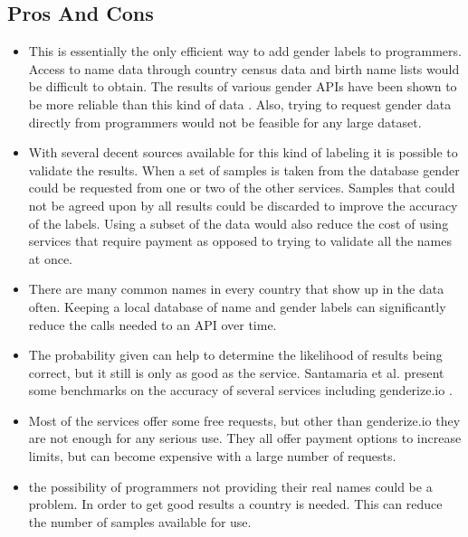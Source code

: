 \documentclass[12pt]{article}
\begin{document}
\subsection{Pros And Cons}
\begin{itemize}
    \item \begin{sloppypar} This is essentially the only efficient way to add gender labels to programmers. Access to name data through country census data and birth name lists would be difficult to obtain. The results of various gender APIs have been shown to be more reliable than this kind of data \cite{Santamaria2018}. Also, trying to request gender data directly from programmers would not be feasible for any large dataset.\end{sloppypar}
    
    \item With several decent sources available for this kind of labeling it is possible to validate the results. When a set of samples is taken from the database gender could be requested from one or two of the other services. Samples that could not be agreed upon by all results could be discarded to improve the accuracy of the labels. Using a subset of the data would also reduce the cost of using services that require payment as opposed to trying to validate all the names at once.
    
    \item There are many common names in every country that show up in the data often. Keeping a local database of name and gender labels can significantly reduce the calls needed to an API over time.

    \item The probability given can help to determine the likelihood of results being correct, but it still is only as good as the service. Santamaria et al. present some benchmarks on the accuracy of several services including genderize.io \cite{Santamaria2018}.

    \item Most of the services offer some free requests, but other than genderize.io they are not enough for any serious use. They all offer payment options to increase limits, but can become expensive with a large number of requests.

    \item the possibility of programmers not providing their real names could be a problem. In order to get good results a country is needed. This can reduce the number of samples available for use.


\end{itemize}
\end{document}
